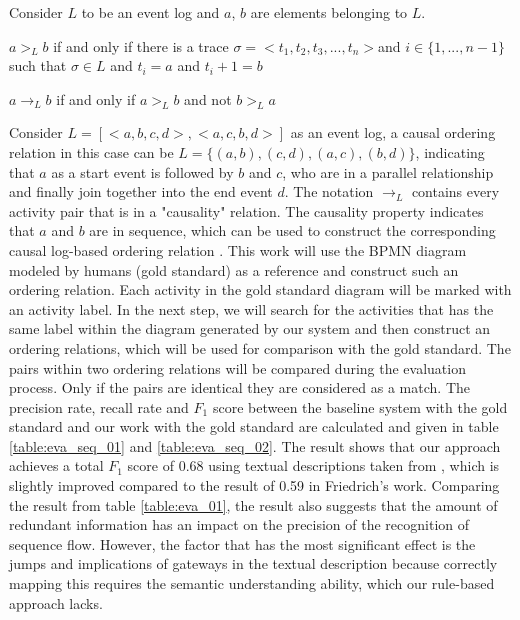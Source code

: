 Consider $L$ to be an event log and $a$, $b$ are elements belonging to $L$. 

\begin{definition}
$a >_L b$ if and only if there is a trace $\sigma =<t_1, t_2, t_3,...,t_n>$and $i \in \{1,...,n-1\}$ such that $\sigma \in L$ and $t_i = a$ and $t_i+1 = b$ \cite{eva_02}
\end{definition}

\begin{definition}[causality]
$a \rightarrow_L b$ if and only if $a >_L b$ and not $b >_L a$ \cite{eva_02}
\end{definition}
Consider $L = [<a,b,c,d>, <a,c,b,d>]$ as an event log, a causal ordering relation in this case can be $L = \{(a,b), (c,d), (a,c), (b,d)\}$, indicating that $a$ as a start event is followed by $b$ and $c$, who are in a parallel relationship and finally join together into the end event $d$. The notation $\rightarrow_L$ contains every activity pair that is in a "causality" relation. The causality property indicates that $a$ and $b$ are in sequence, which can be used to construct the corresponding causal log-based ordering relation \cite{eva_02}. This work will use the BPMN diagram modeled by humans (gold standard) as a reference and construct such an ordering relation. Each activity in the gold standard diagram will be marked with an activity label. In the next step, we will search for the activities that has the same label within the diagram generated by our system and then construct an ordering relations, which will be used for comparison with the gold standard. The pairs within two ordering relations will be compared during the evaluation process. Only if the pairs are identical they are considered as a match. The precision rate, recall rate and $F_1$ score \cite{t2m_5} between the baseline system with the gold standard and our work with the gold standard are calculated and given in table \ref{table:eva_seq_01} and \ref{table:eva_seq_02}. The result shows that our approach achieves a total $F_1$ score of 0.68 using textual descriptions taken from \cite{t2m_1_main}, which is slightly improved compared to the result of 0.59 in Friedrich's work. Comparing the result from table \ref{table:eva_01}, the result also suggests that the amount of redundant information has an impact on the precision of the recognition of sequence flow. However, the factor that has the most significant effect is the jumps and implications of gateways in the textual description because correctly mapping this requires the semantic understanding ability, which our rule-based approach lacks. 

